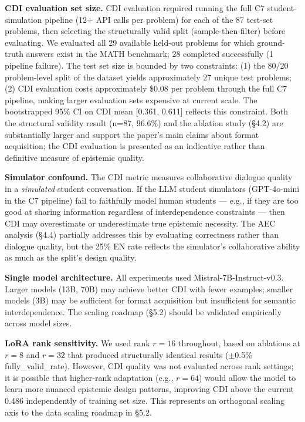 \documentclass[
  11pt,
]{article}
\begin{document}
\textbf{CDI evaluation set size.} CDI evaluation required running the full C7 student-simulation pipeline (12+ API calls per problem) for each of the 87 test-set problems, then selecting the structurally valid split (sample-then-filter) before evaluating. We evaluated all 29 available held-out problems for which ground-truth answers exist in the MATH benchmark; 28 completed successfully (1 pipeline failure). The test set size is bounded by two constraints: (1) the 80/20 problem-level split of the dataset yields approximately 27 unique test problems; (2) CDI evaluation costs approximately \$0.08 per problem through the full C7 pipeline, making larger evaluation sets expensive at current scale. The bootstrapped 95\% CI on CDI mean [0.361, 0.611] reflects this constraint. Both the structural validity result (n=87, 96.6\%) and the ablation study (§4.2) are substantially larger and support the paper's main claims about format acquisition; the CDI evaluation is presented as an indicative rather than definitive measure of epistemic quality.

\textbf{Simulator confound.} The CDI metric measures collaborative
dialogue quality in a \emph{simulated} student conversation. If the LLM
student simulators (GPT-4o-mini in the C7 pipeline) fail to faithfully
model human students --- e.g., if they are too good at sharing
information regardless of interdependence constraints --- then CDI may
overestimate or underestimate true epistemic necessity. The AEC analysis
(§4.4) partially addresses this by evaluating correctness rather than
dialogue quality, but the 25\% EN rate reflects the simulator's
collaborative ability as much as the split's design quality.

\textbf{Single model architecture.} All experiments used
Mistral-7B-Instruct-v0.3. Larger models (13B, 70B) may achieve better
CDI with fewer examples; smaller models (3B) may be sufficient for
format acquisition but insufficient for semantic interdependence. The
scaling roadmap (§5.2) should be validated empirically across model
sizes.

\textbf{LoRA rank sensitivity.} We used rank $r=16$ throughout, based on ablations at $r=8$ and $r=32$ that produced structurally identical results ($\pm$0.5\% fully\_valid\_rate). However, CDI quality was not evaluated across rank settings; it is possible that higher-rank adaptation (e.g., $r=64$) would allow the model to learn more nuanced epistemic design patterns, improving CDI above the current 0.486 independently of training set size. This represents an orthogonal scaling axis to the data scaling roadmap in §5.2.
\end{document}
